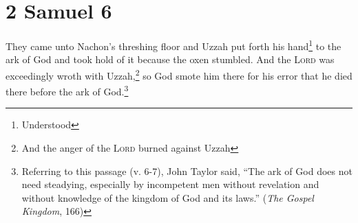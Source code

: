 \section{2 Samuel 6}\label{2 Samuel 6}
\begin{enumerate}
     They came unto Nachon's threshing floor and Uzzah put forth his hand\footnote{Understood} to the ark of God and took hold of it because the oxen stumbled.%
     And the \textsc{Lord} was exceedingly wroth with Uzzah,\footnote{And the anger of the \textsc{Lord} burned against Uzzah} so God smote him there for his error that he died there before the ark of God.\footnote{Referring to this passage (v. 6-7), John Taylor said, ``The ark of God does not need steadying, especially by incompetent men without revelation and without knowledge of the kingdom of God and its laws.'' (\emph{The Gospel Kingdom}, 166)}%
\end{enumerate}
